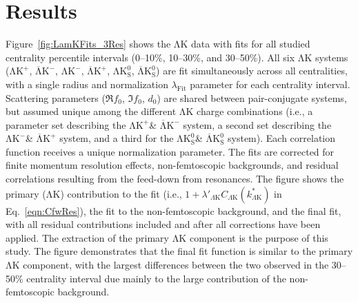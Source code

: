\documentclass{svproc}
\newcommand{\LamK}{$\mathrm{\Lambda}\mathrm{K}$\xspace}
\newcommand{\LamKchP}{$\mathrm{\Lambda}\mathrm{K^{+}}$\xspace}
\newcommand{\ALamKchM}{$\overline{\mathrm{\Lambda}}\mathrm{K^{-}}$\xspace}
\newcommand{\LamKchM}{$\mathrm{\Lambda}\mathrm{K^{-}}$\xspace}
\newcommand{\ALamKchP}{$\overline{\mathrm{\Lambda}}\mathrm{K^{+}}$\xspace}
\newcommand{\LamKs}{$\mathrm{\Lambda}\mathrm{K^{0}_{S}}$\xspace}
\newcommand{\ALamKs}{$\overline{\mathrm{\Lambda}}\mathrm{K^{0}_{S}}$\xspace}
\begin{document}
\section{Results}
\label{sec:Results}

Figure~\ref{fig:LamKFits_3Res} shows the \LamK data with fits for all studied centrality percentile intervals (0--10\%, 10--30\%, and 30--50\%). 
All six \LamK systems (\LamKchP, \ALamKchM, \LamKchM, \ALamKchP, \LamKs, \ALamKs) are fit simultaneously across all centralities, with a single radius and normalization $\lambda_{\mathrm{Fit}}$ parameter for each centrality interval.
Scattering parameters ($\Re f_{0}$, $\Im f_{0}$, $d_{0}$) are shared between pair-conjugate systems, but assumed unique among the different \LamK charge combinations (i.e., a parameter set describing the \LamKchP \& \ALamKchM system, a second set describing the \LamKchM \& \ALamKchP system, and a third for the \LamKs \& \ALamKs system).
Each correlation function receives a unique normalization parameter.
The fits are corrected for finite momentum resolution effects, non-femtoscopic backgrounds, and residual correlations resulting from the feed-down from resonances.  
The figure shows the primary (\LamK) contribution to the fit (i.e., $1 + \lambda'_{\Lambda\mathrm{K}}C_{\Lambda\mathrm{K}}(k^{*}_{\Lambda\mathrm{K}})$ in Eq.~\ref{eqn:CfwRes}), the fit to the non-femtoscopic background, and the final fit, with all residual contributions included and after all corrections have been applied.
The extraction of the primary \LamK component is the purpose of this study.
The figure demonstrates that the final fit function is similar to the primary \LamK component, with the largest differences between the two observed in the 30--50\% centrality interval due mainly to the large contribution of the non-femtoscopic background.
\end{document}
